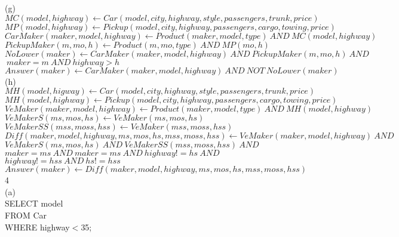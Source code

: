 \documentclass[11pt, oneside]{article}   	%
\begin{document}
(g)\\
$MC(model, highway) \gets Car(model, city, highway, style, passengers, trunk, price)$\\
$MP(model, highway) \gets Pickup(model, city, highway, passengers, cargo, towing, price)$\\
$CarMaker(maker, model, highway) \gets Product(maker, model, type) \ AND \ MC(model, highway)$\\
$PickupMaker(m, mo, h) \gets Product(m, mo, type) \ AND \ MP(mo, h)$\\
$NoLower(maker) \gets CarMaker(maker, model, highway) \ AND \ PickupMaker(m, mo, h) \ AND $
\hspace*{3.5cm}$\ maker=m \ AND \ highway> h$\\
$Answer(maker)\gets CarMaker(maker, model, highway) \ AND \ NOT\ NoLower(maker)$\\

(h)\\
$MH(model, higway)\gets Car(model, city, highway, style, passengers, trunk, price) $\\
$MH(model, highway)\gets Pickup(model, city, highway, passengers, cargo, towing, price)$\\
$VeMaker(maker, model, highway)\gets Product(maker, model, type) \ AND\ MH(model, highway) $\\
$VeMakerS(ms, mos, hs)\gets VeMaker(ms, mos, hs)$\\
$VeMakerSS(mss, moss, hss)\gets VeMaker(mss, moss, hss)$\\
$Diff(maker, model, highway, ms, mos, hs, mss, moss, hss)\gets VeMaker(maker, model, highway) \ AND\ $\\
\hspace*{3cm}$VeMakerS(ms, mos, hs)\ AND\ VeMakerSS(mss, moss, hss)\ AND$\\
\hspace*{3cm}$ maker=ms\ AND \ maker=ms\ AND \ highway!=hs\ AND \ $\\
\hspace*{3cm}$highway!=hss\ AND \ hs!=hss$\\
$Answer(maker)\gets Diff(maker, model, highway, ms, mos, hs, mss, moss, hss)$\\

4\\

(a)\\
SELECT model\\
FROM Car\\
WHERE highway$<$35;\\
\end{document}
